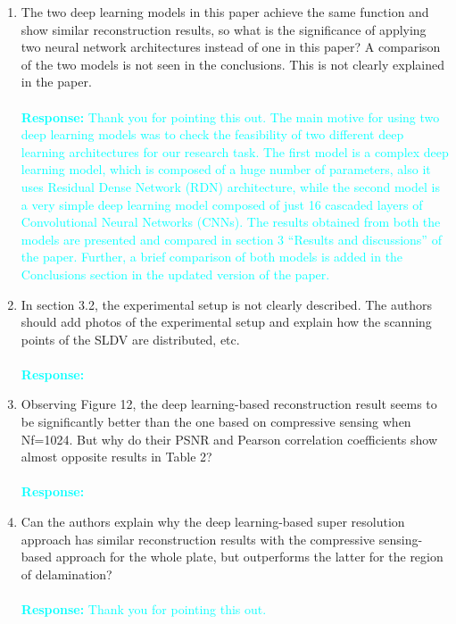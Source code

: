 \documentclass[11pt,a2paper]{report}
\begin{document}
\begin{enumerate}
{			A flow chart illustrating the complete procedure of the proposed approach was added.
		}
		\item The two deep learning models in this paper achieve the same function and show similar reconstruction results, so what is the significance of applying two neural network architectures instead of one in this paper? A comparison of the two models is not seen in the conclusions. 
		This is not clearly explained in the paper. 
		\\ \\ 
		\textcolor{Cyan}
		{
			\textbf{Response:}
			Thank you for pointing this out. 
			The main motive for using two deep learning models was to check the feasibility of two different deep learning architectures for our research task. 
			The first model is a complex deep learning model, which is composed of a huge number of parameters, also it uses Residual Dense Network (RDN) architecture, while the second model is a very simple deep learning model composed of just 16 cascaded layers of Convolutional Neural Networks (CNNs). 
			The results obtained from both the models are presented and compared in section 3 \enquote{Results and discussions} of the paper. Further, a brief comparison of both models is added in the Conclusions section in the updated version of the paper.			
		}
		\item In section 3.2, the experimental setup is not clearly described. 
		The authors should add photos of the experimental setup and explain how the scanning points of the SLDV are distributed, etc.
		\\ \\ 
		\textcolor{Cyan}
		{
			\textbf{Response:}
		}
		\item  Observing Figure 12, the deep learning-based reconstruction result seems to be significantly better than the one based on compressive sensing when Nf=1024. 
		But why do their PSNR and Pearson correlation coefficients show almost opposite results in Table 2?
		\\ \\ 
		\textcolor{Cyan}
		{
			\textbf{Response:}
		}
		\item  Can the authors explain why the deep learning-based super resolution approach has similar reconstruction results with the compressive sensing-based approach for the whole plate, but outperforms the latter for the region of delamination?
		\\ \\ 
		\textcolor{Cyan}
		{
			\textbf{Response:}
			Thank you for pointing this out. \\
}
\end{enumerate}
\end{document}
